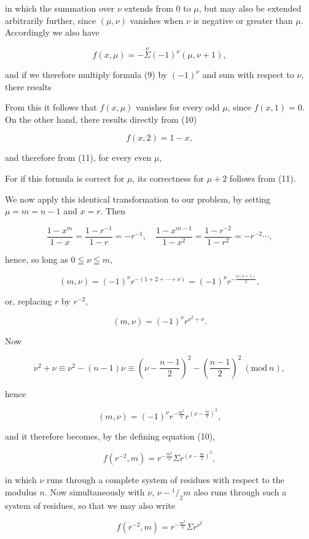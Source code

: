 
in which the summation over $\nu$ extends from 0 to $\mu$, but may
also be extended arbitrarily further, since $(\mu, \nu)$ vanishes
when $\nu$ is negative or greater than $\mu$. Accordingly we also have

\[ f(x, \mu) = -\overset{\nu}{\Sigma} (-1)^{\nu} (\mu, \nu + 1), \]

and if we therefore multiply formula (9) by $(-1)^{\nu}$ and
sum with respect to $\nu$, there results


From this it follows that $f(x, \mu)$ vanishes for every odd $\mu$, since $f(x, 1) = 0$. On the other hand, there results directly
from (10)

\[ f(x, 2) = 1 - x, \]

and therefore from (11), for every even $\mu$,


For if this formula is correct for $\mu$, its correctness for
$\mu + 2$ follows from (11).

We now apply this identical transformation to our
problem, by setting $\mu = m = n - 1$ and $x = r$. Then

\[ \frac{1 - x^m}{1 - x} = \frac{1 - r^{-1}}{1 - r} = -r^{-1}, \quad \frac{1 - x^{m - 1}}{1 - x^2} = \frac{1 - r^{-2}}{1 - r^2} = -r^{-2} \cdots, \]

hence, so long as $0 \leqq \nu \leqq m$,

\[ (m, \nu) = (-1)^{\nu} r^{-(1 + 2 + \cdots + \nu)} = (-1)^{\nu} r^{-\frac{\nu(\nu + 1)}{2}}, \]

or, replacing $r$ by $r^{-2}$,

\[ (m, \nu) = (-1)^{\nu} r^{\nu^2 + \nu}. \]

Now

\[ \nu^2 + \nu \equiv \nu^2 - (n - 1) \nu \equiv \left( \nu - \frac{n - 1}{2} \right)^2 - \left( \frac{n - 1}{2} \right)^2 \ (\mathrm{mod}\ n), \]

hence

\[ (m, \nu) = (-1)^{\nu} r^{-\frac{m^2}{4}} r^{\left( \nu - \frac{m}{2} \right)^2}, \]

and it therefore becomes, by the defining equation (10),

\[ f(r^{-2}, m) = r^{-\frac{m^2}{4}} \Sigma r^{\left( \nu - \frac{m}{2} \right)^2}, \]

in which $\nu$ runs through a complete system of residues with respect to the modulus $n$.
Now simultaneously with $\nu$, $\nu - {}^1/_2 m$ also runs through such a
system of residues, so that we may also write

\[ f(r^{-2}, m) = r^{-\frac{m^2}{4}} \Sigma r^{\nu^2} \]
